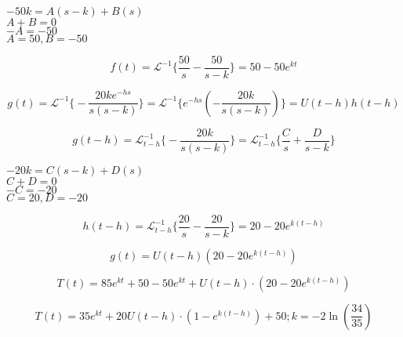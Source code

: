 \begin{center}
$-50k = A(s-k) + B(s)$\\ 
\vspace{8pt}
$A + B = 0$\\ 
\vspace{8pt}
$-A = -50$\\ 
\vspace{8pt}
$A = 50, B = -50$\\ 
\vspace{8pt}

\begin{equation*}
    f(t) = \mathscr{L}^{-1} \biggl\{ \frac{50}{s} - \frac{50}{s-k} \biggr\} = 50 - 50e^{kt}
\end{equation*}

\begin{equation*}
    g(t) = \mathscr{L}^{-1} \biggl\{ -\frac{20ke^{-hs}}{s(s-k)} \biggr\} = \mathscr{L}^{-1} \biggl\{ e^{-hs}\left(-\frac{20k}{s(s-k)}\right) \biggr\} = U(t-h)h(t-h)
\end{equation*}

\begin{equation*}
    g(t-h) = \mathscr{L}_{t-h}^{-1} \biggl\{ -\frac{20k}{s(s-k)} \biggr\} = \mathscr{L}_{t-h}^{-1} \biggl\{ \frac{C}{s} + \frac{D}{s-k} \biggr\}
\end{equation*}

$-20k = C(s-k) + D(s)$\\ 
\vspace{8pt}
$C + D = 0 $\\ 
\vspace{8pt}
$-C = -20$\\ 
\vspace{8pt}
$C = 20, D = -20$

\begin{equation*}
    h(t-h) = \mathscr{L}_{t-h}^{-1} \biggl\{ \frac{20}{s} - \frac{20}{s-k} \biggr\} = 20 - 20e^{k(t-h)}
\end{equation*}

\begin{equation*}
    g(t) = U(t-h)\left( 20 - 20e^{k(t-h)}\right)
\end{equation*}

\begin{equation*}
    T(t) = 85e^{kt} + 50 - 50e^{kt} + U(t-h)\cdot\left( 20 - 20e^{k(t-h)}\right)
\end{equation*}

\begin{equation}
    T(t) = 35e^{kt} + 20U(t-h)\cdot\left( 1 - e^{k(t-h)}\right) + 50; k = -2\ln{\left(\frac{34}{35}\right)}
\end{equation}
\end{center}